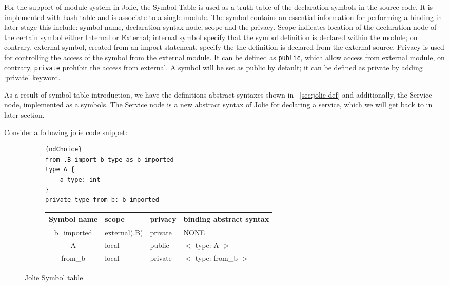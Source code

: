 For the support of module system in Jolie, the Symbol Table is used as a truth table of the declaration symbols in the source code.
It is implemented with hash table and is associate to a single module.
The symbol contains an essential information for performing a binding in later stage this include: symbol name, declaration syntax node, scope and the privacy.
Scope indicates location of the declaration node of the certain symbol either Internal or External; internal symbol specify that the symbol definition is declared within the module; on contrary, external symbol, created from an import statement, specify the the definition is declared from the external source.
Privacy is used for controlling the access of the symbol from the external module. It can be defined as \texttt{public}, which allow access from external module, on contrary, \texttt{private} prohibit the access from external. A symbol will be set as public by default; it can be defined as private by adding `private' keyword.

As a result of symbol table introduction, we have the definitions abstract syntaxes shown in ~\ref{sec:jolie-def} and additionally, the Service node, implemented as a symbols. The Service node is a new abstract syntax of Jolie for declaring a service, which we will get back to in later section.

Consider a following jolie code snippet:

\begin{figure}[h]
    \begin{subfigure}[b]{\textwidth}
        \lstset{language=Jolie,
            style=codeStyle,
            numbers=left,
            firstnumber=1
        }
        \begin{lstlisting}[frame=tlrb]{ndChoice}
from .B import b_type as b_imported
type A {
    a_type: int
}
private type from_b: b_imported
\end{lstlisting}
    \end{subfigure}
    \begin{subfigure}[b]{\textwidth}
        \begin{tabular}{ |c|l|l|l| }
            \hline
            Symbol name & scope    & privacy & binding abstract syntax \\
            \hline
            b_imported  & external(.B) & private  & NONE                    \\
            A           & local    & public  & $<$ type: A $>$         \\
            from_b      & local    & private & $<$ type: from_b $>$    \\
            \hline
        \end{tabular}
    \end{subfigure}
    \caption{Jolie Symbol table }
    \label{fig:jolie-ex-symbol-table}
\end{figure}

